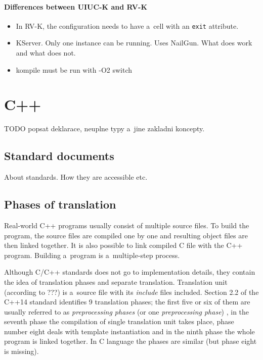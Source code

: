 \documentclass{fithesis3}
\begin{document}
\paragraph{Differences between UIUC-K and RV-K}
\begin{itemize}
\item In RV-K, the configuration needs to have a~cell with an \texttt{exit} attribute.
\item KServer. Only one instance can be running. Uses NailGun. What does work and what does not.
\item kompile must be run with -O2 switch
\end{itemize}

\section{C++}

\ifshowoldstuff


TODO popsat deklarace, neuplne typy a~jine zakladni koncepty.


\subsection{Standard documents}

About standards. How they are accessible etc.

\subsection{Phases of translation}
\label{txt:phases-of-translation}
Real-world C++ programs usually consist of multiple source files. To build the program, the source files are compiled one by one and resulting object files are then linked together. It is also possible to link compiled C file with the C++ program. Building a~program is a~multiple-step process.


Although C/C++ standards does not go to implementation details, they contain the idea of translation phases and separate translation. Translation unit (according to ???) is a~source file with its \textit{include} files included. Section 2.2 of the C++14 standard identifies 9 translation phases; the first five or six of them are usually referred to as \textit{preprocessing phases} (or one \textit{preprocessing phase}) , in the seventh phase the compilation of single translation unit takes place, phase number eight deals with template instantiation and in the ninth phase the whole program is linked together. In C language the phases are similar (but phase eight is missing).
\end{document}
